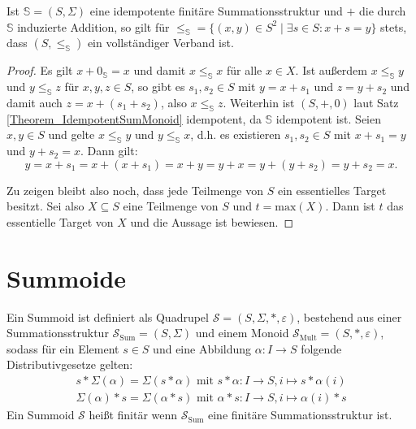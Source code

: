 \documentclass{article}
\begin{document}
\begin{theorem}
  Ist $\mathbb{S} = (S, \Sigma)$ eine idempotente finitäre Summationsstruktur 
  und $+$ die durch $\mathbb{S}$ induzierte Addition, 
  so gilt für $\leq_\mathbb{S} = \{(x, y) \in S^2 \mid \exists s \in S \colon x + s = y\}$ stets,
  dass $(S, \leq_{\mathbb{S}})$ ein vollständiger Verband ist.
\end{theorem}
\begin{proof}
  Es gilt $x + 0_\mathbb{S} = x$ und damit $x \leq_\mathbb{S} x$ für alle $x \in X$.
  Ist außerdem $x \leq_\mathbb{S} y$ und $y \leq_\mathbb{S} z$ für $x, y, z \in S$,
  so gibt es $s_1, s_2 \in S$ mit $y = x + s_1$ und $z = y + s_2$
  und damit auch $z = x + (s_1 + s_2)$, also $x \leq_\mathbb{S} z$.
  Weiterhin ist $(S, +, 0)$ laut Satz \ref{Theorem_IdempotentSumMonoid} idempotent, da $\mathbb{S}$ idempotent ist.
  Seien $x, y \in S$ und gelte $x \leq_\mathbb{S} y$ und $y \leq_\mathbb{S} x$, d.h.
  es existieren $s_1, s_2 \in S$ mit $x + s_1 = y$ und $y + s_2 = x$. Dann gilt:
  \begin{equation*}
    y = x + s_1 = x + (x + s_1) = x + y = y + x = y + (y + s_2) = y + s_2 = x.
  \end{equation*}

  Zu zeigen bleibt also noch, dass jede Teilmenge von $S$ ein essentielles Target besitzt.
  Sei also $X \subseteq S$ eine Teilmenge von $S$ und $t = \text{max}(X)$.
  Dann ist $t$ das essentielle Target von $X$ und die Aussage ist bewiesen.
\end{proof}

\newpage
\section{Summoide}

\begin{definition}
  Ein Summoid ist definiert als Quadrupel $\mathcal{S} = (S, \Sigma, *, \varepsilon)$,
  bestehend aus einer Summationsstruktur $\mathcal{S}_\text{Sum} = (S, \Sigma)$ und 
  einem Monoid $\mathcal{S}_\text{Mult} = (S, *, \varepsilon)$, sodass
  für ein Element $s \in S$ und eine Abbildung $\alpha \colon I \to S$ folgende Distributivgesetze gelten:
  \begin{align*}
    s \ast \Sigma(\alpha) = \Sigma(s \ast \alpha) \text{ mit } s \ast \alpha \colon I \to S, i \mapsto s \ast \alpha(i) \\
    \Sigma(\alpha) \ast s = \Sigma(\alpha \ast s) \text{ mit } \alpha \ast s \colon I \to S, i \mapsto \alpha(i) \ast s
  \end{align*}
  Ein Summoid $\mathcal{S}$ heißt finitär wenn $\mathcal{S}_\text{Sum}$ eine finitäre Summationsstruktur ist.
\end{definition}
\end{document}
